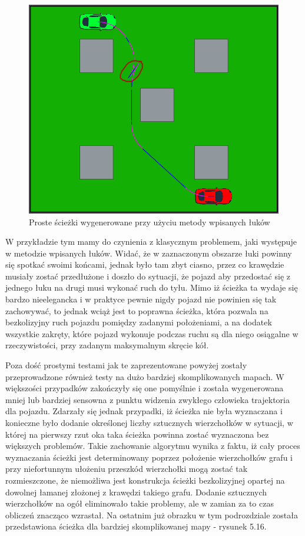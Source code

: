 \documentclass[a4paper,11pt,twoside]{report}
\theoremstyle{definition}
\begin{document}
\begin{figure}[h!]
\centering
\includegraphics[scale=0.6]{simplePath3}
\caption[Proste ścieżki wygenerowane przy użyciu metody wpisanych łuków]{Proste ścieżki wygenerowane przy użyciu metody wpisanych łuków}
\end{figure}

W przykładzie tym mamy do czynienia z klasycznym problemem, jaki występuje w metodzie wpisanych łuków. Widać, że w zaznaczonym obszarze łuki powinny się spotkać swoimi końcami, jednak było tam zbyt ciasno, przez co krawędzie musiały zostać przedłużone i doszło do sytuacji, że pojazd aby przedostać się z jednego łuku na drugi musi wykonać ruch do tyłu. Mimo iż ścieżka ta wydaje się bardzo nieelegancka i w praktyce pewnie nigdy pojazd nie powinien się tak zachowywać, to jednak wciąż jest to poprawna ścieżka, która pozwala na bezkolizyjny ruch pojazdu pomiędzy zadanymi położeniami, a na dodatek wszystkie zakręty, które pojazd wykonuje podczas ruchu są dla niego osiągalne w rzeczywistości, przy zadanym maksymalnym skręcie kół.

Poza dość prostymi testami jak te zaprezentowane powyżej zostały przeprowadzone również testy na dużo bardziej skomplikowanych mapach. W większości przypadków zakończyły się one pomyślnie i została wygenerowana mniej lub bardziej sensowna z punktu widzenia zwykłego człowieka trajektoria dla pojazdu. Zdarzały się jednak przypadki, iż ścieżka nie była wyznaczana i konieczne było dodanie określonej liczby sztucznych wierzchołków w sytuacji, w której na pierwszy rzut oka taka ścieżka powinna zostać wyznaczona bez większych problemów. Takie zachowanie algorytmu wynika z faktu, iż cały proces wyznaczania ścieżki jest determinowany poprzez położenie wierzchołków grafu i przy niefortunnym ułożeniu przeszkód wierzchołki mogą zostać tak rozmieszczone, że niemożliwa jest konstrukcja ścieżki bezkolizyjnej opartej na dowolnej łamanej złożonej z krawędzi takiego grafu. Dodanie sztucznych wierzchołków na ogół eliminowało takie problemy, ale w zamian za to czas obliczeń znacząco wzrastał. Na ostatnim już obrazku w tym podrozdziale została przedstawiona ścieżka dla bardziej skomplikowanej mapy - rysunek 5.16.
\end{document}
